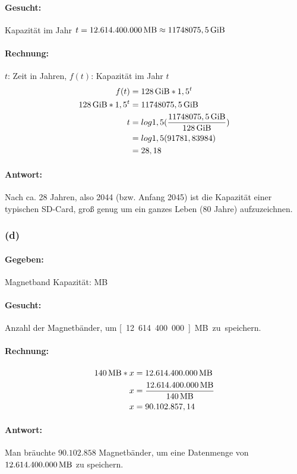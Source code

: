 \documentclass[11pt,a4paper]{article}
\begin{document}
\paragraph{Gesucht:}
    Kapazität im Jahr $t = \unit[12.614.400.000]{MB} \approx \unit[11748075,5]{GiB}$

\paragraph{Rechnung:}
    $t$: Zeit in Jahren, $f(t)$: Kapazität im Jahr $t$
\begin{align}
    f(t) &= \unit[128]{GiB}*1,5^{t}\\
    \unit[128]{GiB}*1,5^{t} &= \unit[11748075,5]{GiB}\\
    t &= log1,5(\frac{\unit[11748075,5]{GiB}}{\unit[128]{GiB}})\\
      &= log1,5(91781,83984)\\
       &= 28,18\\
\end{align}

\paragraph{Antwort:}
    Nach ca. 28 Jahren, also 2044 (bzw. Anfang 2045) ist die Kapazität einer typischen SD-Card, groß genug um ein ganzes Leben (80 Jahre) aufzuzeichnen.


\subsubsection{(d)} %

\paragraph{Gegeben:}
    Magnetband Kapazität: \unit[140]{MB}

\paragraph{Gesucht:}
    Anzahl der Magnetbänder, um \unit[12.614.400.000]{MB} zu speichern.

\paragraph{Rechnung:}
\begin{align}
    \unit[140]{MB}*x &= \unit[12.614.400.000]{MB}\\
    x &= \frac{\unit[12.614.400.000]{MB}}{\unit[140]{MB}}\\
    x &= 90.102.857,14
\end{align}

\paragraph{Antwort:}
    Man bräuchte $90.102.858$ Magnetbänder, um eine Datenmenge von $\unit[12.614.400.000]{MB}$ zu speichern.


\newpage



\end{document}
